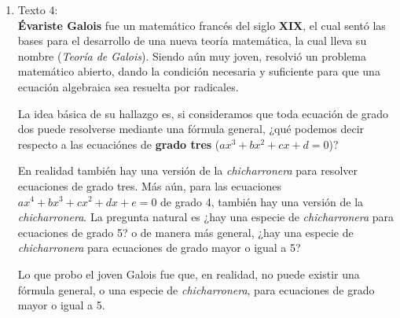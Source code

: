 \documentclass[12pt]{article}
\begin{document}
\begin{enumerate}
    \item[] Texto 4:\\
    \textbf{Évariste Galois} fue un matemático francés del siglo \textbf{XIX}, el cual sentó las bases para el desarrollo de una nueva teoría matemática, la cual lleva su nombre (\textit{Teoría de Galois}). Siendo aún muy joven, resolvió un problema matemático abierto, dando la condición necesaria y suficiente para que una ecuación algebraica sea resuelta por radicales.
    
    La idea básica de su hallazgo es, si consideramos que toda ecuación de grado dos puede resolverse mediante una fórmula general, ¿qué podemos decir respecto a las ecuaciónes de \textbf{grado tres} ($ax^{3}+bx^{2}+cx+d=0$)? 
    
    En realidad también hay una versión de la \textit{chicharronera} para resolver ecuaciones de grado tres. Más aún, para las ecuaciones $ax^{4}+bx^{3}+cx^{2}+dx+e=0$ de grado 4, también hay una versión de la \textit{chicharronera}. La pregunta natural es ¿hay una especie de \textit{chicharronera} para ecuaciones de grado 5? o de manera más general, ¿hay una especie de \textit{chicharronera} para ecuaciones de grado mayor o igual a 5?
    
    Lo que probo el joven Galois fue que, en realidad, no puede existir una fórmula general, o una especie de \textit{chicharronera}, para ecuaciones de grado mayor o igual a 5.
    

\end{enumerate}
\end{document}
